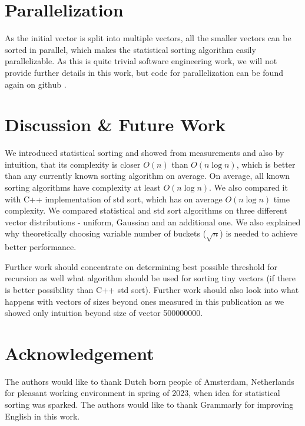 \documentclass[12pt]{article}
\begin{document}
	\section{Parallelization}
	
	As the initial vector is split into multiple vectors, all the smaller vectors can be sorted in parallel, which makes the statistical sorting algorithm easily parallelizable. As this is quite trivial software engineering work, we will not provide further details in this work, but code for parallelization can be found again on github \cite{peta78b}.

	\section{Discussion \& Future Work}
	
	We introduced statistical sorting and showed from measurements and also by intuition, that its complexity is closer $O(n)$ than $O(n \log n)$, which is better than any currently known sorting algorithm on average. On average, all known sorting algorithms have complexity at least $O( n \log n)$. We also compared it with C++ implementation of std sort, which has on average $O(n \log n)$ time complexity. We compared statistical and std sort algorithms on three different vector distributions - uniform, Gaussian and an additional one. We also explained why theoretically choosing variable number of buckets ($\sqrt{n}$) is needed to achieve better performance.
	
	Further work should concentrate on determining best possible threshold for recursion as well what algorithm should be used for sorting tiny vectors (if there is better possibility than C++ std sort). Further work should also look into what happens with vectors of sizes beyond ones measured in this publication as we showed only intuition beyond size of vector 500000000.
	
	\section*{Acknowledgement}
	
	The authors would like to thank Dutch born people of Amsterdam, Netherlands for pleasant working environment in spring of 2023, when idea for statistical sorting was sparked. The authors would like to thank Grammarly for improving English in this work.
	
\end{document}
